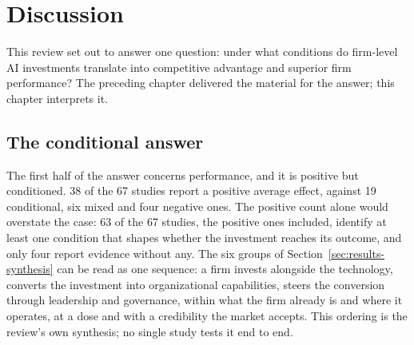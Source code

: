 \chapter{Discussion}
\label{sec:discussion}

This review set out to answer one question: under what conditions do firm-level AI
investments translate into competitive advantage and superior firm performance? The
preceding chapter delivered the material for the answer; this chapter interprets it.

\section{The conditional answer}
\label{sec:disc-answer}

The first half of the answer concerns performance, and it is positive but conditioned.
38 of the 67 studies report a positive average effect, against 19 conditional, six
mixed and four negative ones. The positive count alone would overstate the case: 63 of
the 67 studies, the positive ones included, identify at least one condition that shapes
whether the investment reaches its outcome, and only four report evidence without any.
The six groups of Section~\ref{sec:results-synthesis} can be read as one sequence: a
firm invests alongside the technology, converts the investment into organizational
capabilities, steers the conversion through leadership and governance, within what the
firm already is and where it operates, at a dose and with a credibility the market
accepts. This ordering is the review's own synthesis; no single study tests it end to
end.

